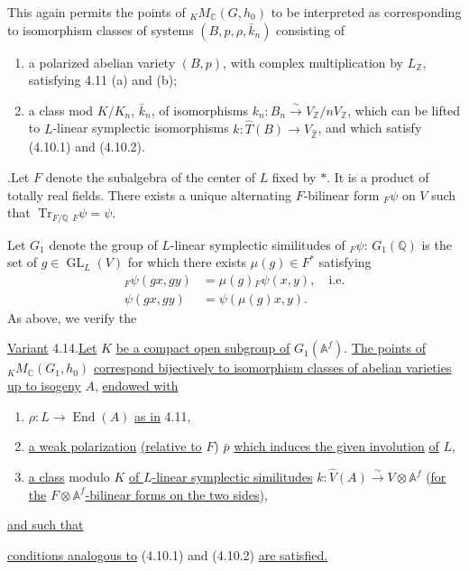 \documentclass[10pt]{article}
\newcommand{\Af}{\mathbb A^f}
\newcommand{\C}{\mathbb C}
\newcommand{\Q}{\mathbb Q}
\newcommand{\Z}{\mathbb Z}
\newcommand{\GL}{\operatorname{GL}}
\newcommand{\End}{\operatorname{End}}
\newcommand{\Tr}{\operatorname{Tr}}
\begin{document}
This again permits the points of ${}_K M_{\C}(G,h_0)$ to be interpreted as corresponding to isomorphism classes of systems $(B,p,\rho,\bar k_n)$ consisting of
\begin{enumerate}[label=(\alph*)]
\item a polarized abelian variety $(B,p)$, with complex multiplication by $L_\Z$, satisfying 4.11 (a) and (b);
\item a class mod $K/K_n$, $\bar k_n$, of isomorphisms $k_n:B_n\xrightarrow{\sim}V_\Z/nV_\Z$, which can be lifted to $L$-linear symplectic isomorphisms $k:\widehat T(B)\longrightarrow V_{\widehat{\Z}}$, and which satisfy (4.10.1) and (4.10.2).
\end{enumerate}

.\quad Let $F$ denote the subalgebra of the center of $L$ fixed by $*$. It is a product of totally real fields. There exists a unique alternating $F$-bilinear form ${}_F\psi$ on $V$ such that $\Tr_{F/\Q}{}_F\psi=\psi$.

Let $G_1$ denote the group of $L$-linear symplectic similitudes of ${}_F\psi$: $G_1(\Q)$ is the set of $g\in\GL_L(V)$ for which there exists $\mu(g)\in F^*$ satisfying
\begingroup
\makeatletter
\tagsleft@true
\makeatother
\begin{align}
{}_F\psi(gx,gy)&=\mu(g){}_F\psi(x,y),\quad\text{i.e.}\tag{4.13.1}\\
\psi(gx,gy)&=\psi(\mu(g)x,y).\tag{4.13.2}
\end{align}
\endgroup
As above, we verify the

\noindent \uline{Variant} 4.14.\quad \uline{Let} $K$ \uline{be a compact open subgroup of} $G_1(\Af)$. \uline{The points of} ${}_K M_{\C}(G_1,h_0)$ \uline{correspond bijectively to isomorphism classes of abelian varieties} \uline{up to isogeny} $A$, \uline{endowed with}
\begin{enumerate}[label=(\alph*)]
\item $\rho:L\longrightarrow\End(A)$ \uline{as in} 4.11,
\item \uline{a weak polarization} \uline{(relative to} $F$) $\bar p$ \uline{which induces the given involution} \uline{of} $L$,
\item \uline{a class} modulo $K$ \uline{of $L$-linear symplectic similitudes} $k:\widehat V(A)\xrightarrow{\sim}V\otimes\Af$ (\uline{for the} $F\otimes\Af$\uline{-bilinear forms on the two sides}),
\end{enumerate}
\uline{and such that}
\begin{list}{}{\setlength{\leftmargin}{4em}\setlength{\labelwidth}{3em}\setlength{\labelsep}{1em}\setlength{\topsep}{.4em}\setlength{\itemsep}{0pt}}
\item[(*)] \uline{conditions analogous to} (4.10.1) and (4.10.2) \uline{are satisfied.}
\end{list}
\end{document}

